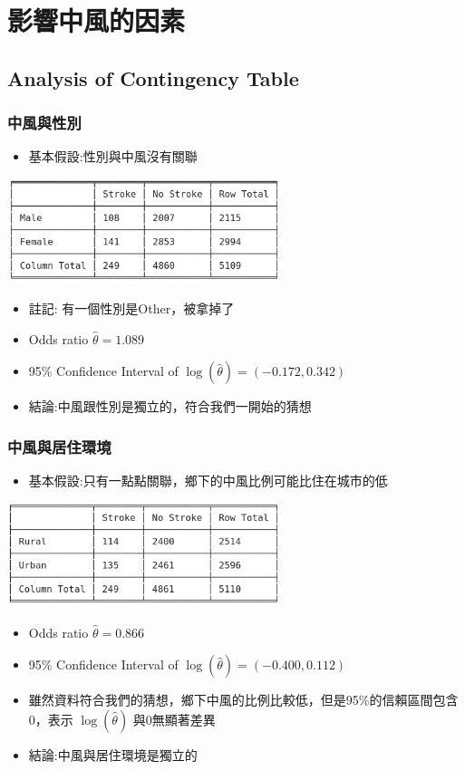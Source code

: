 \chapter{影響中風的因素}
\section{Analysis of Contingency Table}
\subsection{中風與性別}
\begin{itemize}
    \item 基本假設:性別與中風沒有關聯
\end{itemize}
\begin{center}
\includegraphics[width=8cm]{./two_by_two_table/gender_stroke.png}
\end{center}
\begin{itemize}
    \item 註記: 有一個性別是Other，被拿掉了
    \item Odds ratio $\hat{\theta}=1.089$
    \item 95\% Confidence Interval of $\log{(\hat{\theta})}=(-0.172, 0.342)$
    \item 結論:中風跟性別是獨立的，符合我們一開始的猜想
\end{itemize}

\subsection{中風與居住環境}
\begin{itemize}
    \item 基本假設:只有一點點關聯，鄉下的中風比例可能比住在城市的低
\end{itemize}
\begin{center}
    \includegraphics[width=8cm]{./two_by_two_table/resitype_stroke.png}
\end{center}
\begin{itemize}
    \item Odds ratio $\hat{\theta}=0.866$
    \item 95\% Confidence Interval of $\log{(\hat{\theta})}=(-0.400, 0.112)$
    \item 雖然資料符合我們的猜想，鄉下中風的比例比較低，但是95\%的信賴區間包含0，表示 $\log{(\hat{\theta})}$ 與0無顯著差異
    \item 結論:中風與居住環境是獨立的
\end{itemize}

